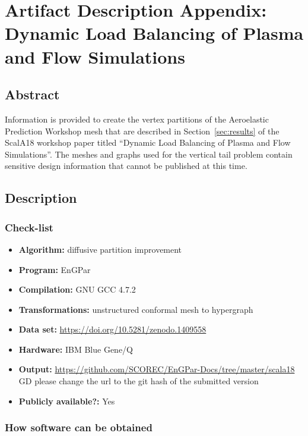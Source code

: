 \appendices

\section{Artifact Description Appendix: 
Dynamic Load Balancing of Plasma and Flow Simulations}

\subsection{Abstract}

Information is provided to create the vertex partitions of the Aeroelastic
Prediction Workshop mesh that are described in Section~\ref{sec:results} of the ScalA18
workshop paper titled ``Dynamic Load Balancing of Plasma and Flow Simulations''.
The meshes and graphs used for the vertical tail problem contain sensitive
design information that cannot be published at this time.

\subsection{Description}

\subsubsection{Check-list}

{\small
\begin{itemize}
  \item {\bf Algorithm: } diffusive partition improvement
  \item {\bf Program: } EnGPar
  \item {\bf Compilation: } GNU GCC 4.7.2
  \item {\bf Transformations: } unstructured conformal mesh to hypergraph
  \item {\bf Data set: } \url{https://doi.org/10.5281/zenodo.1409558}
  \item {\bf Hardware: } IBM Blue Gene/Q
  \item {\bf Output: } \url{https://github.com/SCOREC/EnGPar-Docs/tree/master/scala18}
    {\color{red} GD please change the url to the git hash of the submitted version}
  \item {\bf Publicly available?: } Yes
\end{itemize}
}

\subsubsection{How software can be obtained}

